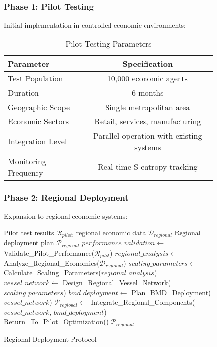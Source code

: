 \begin{figure}[h]
    \subsubsection{Phase 1: Pilot Testing}
    
    Initial implementation in controlled economic environments:
    
    \begin{table}[h]
    \centering
    \caption{Pilot Testing Parameters}
    \begin{tabular}{@{}lc@{}}
    \toprule
    \textbf{Parameter} & \textbf{Specification} \\
    \midrule
    Test Population & 10,000 economic agents \\
    Duration & 6 months \\
    Geographic Scope & Single metropolitan area \\
    Economic Sectors & Retail, services, manufacturing \\
    Integration Level & Parallel operation with existing systems \\
    Monitoring Frequency & Real-time S-entropy tracking \\
    \bottomrule
    \end{tabular}
    \end{table}
    
    \subsubsection{Phase 2: Regional Deployment}
    
    Expansion to regional economic systems:
    
    \begin{algorithm}
    \caption{Regional Deployment Protocol}
    \begin{algorithmic}[1]
    \REQUIRE Pilot test results $\mathcal{R}_{pilot}$, regional economic data $\mathcal{D}_{regional}$
    \ENSURE Regional deployment plan $\mathcal{P}_{regional}$
    \STATE $performance\_validation \leftarrow$ Validate\_Pilot\_Performance($\mathcal{R}_{pilot}$)
        \STATE $regional\_analysis \leftarrow$ Analyze\_Regional\_Economics($\mathcal{D}_{regional}$)
        \STATE $scaling\_parameters \leftarrow$ Calculate\_Scaling\_Parameters($regional\_analysis$)
        \STATE $vessel\_network \leftarrow$ Design\_Regional\_Vessel\_Network($scaling\_parameters$)
        \STATE $bmd\_deployment \leftarrow$ Plan\_BMD\_Deployment($vessel\_network$)
        \STATE $\mathcal{P}_{regional} \leftarrow$ Integrate\_Regional\_Components($vessel\_network$, $bmd\_deployment$)
    \ELSE
        \STATE Return\_To\_Pilot\_Optimization()
    \ENDIF
    \RETURN $\mathcal{P}_{regional}$
    \end{algorithmic}
    \end{algorithm}
    

\end{figure}
